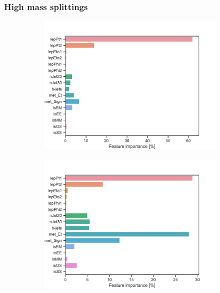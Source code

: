 \subsubsection{High mass splittings}
\begin{figure}[H]
    \centering
    \begin{subfigure}[t!]{0.49\textwidth}
        \includegraphics[width = \textwidth]{Figures/SlepSlep/ML/BDT/Low_level/High/featureImportance.pdf}
        \caption{}
        \label{fig:featSlepslepLow}
    \end{subfigure}
    \begin{subfigure}[t!]{0.49\textwidth}
        \includegraphics[width = \textwidth]{Figures/SlepSnu/BDT/Low_level/High/featureImportance.pdf}

\end{subfigure}
\end{figure}
